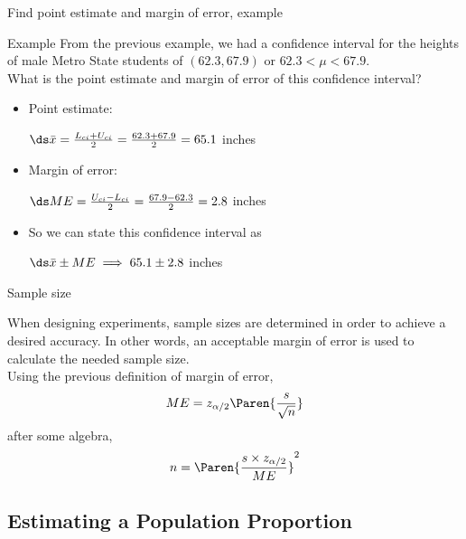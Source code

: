 \documentclass[xcolor=table, handout]{beamer}
\begin{document}
\begin{frame}{Find point estimate and margin of error, example}
\begin{exampleblock}{Example}
From the previous example, we had a confidence interval for the heights of male Metro State students of $(62.3, 67.9)$ or $62.3 < \mu < 67.9$.\\
\medskip
 What is the point estimate and margin of error of this confidence interval?\\
\medskip
\begin{itemize}
\pause\item Point estimate:\\
\smallskip
{\centering
$\ds \bar x = \frac {L_{ci} + U_{ci}}{2} = \frac {62.3 + 67.9}{2} = 65.1$ inches
\par}
\smallskip
\pause\item Margin of error:\\
\smallskip
{\centering
$\ds ME = \frac {U_{ci} - L_{ci}}{2} = \frac {67.9 - 62.3}{2} = 2.8$ inches
\par}
\smallskip
\pause\item So we can state this confidence interval as\\
\smallskip
{\centering
$\ds \bar x \pm ME \implies 65.1 \pm 2.8$ inches
\par}

\end{itemize}
\medskip
\end{exampleblock}

\end{frame}

\begin{frame}{Sample size}
\begin{block}{}
\large
When designing experiments, sample sizes are determined in order to achieve a desired accuracy. In other words, an acceptable margin of error is used to calculate the needed sample size.\\
\pause\medskip
Using the previous definition of margin of error,
\[ME = z_{\alpha/2} \Paren{\frac s {\sqrt n}}\]
after some algebra,
\[ n = \Paren{\frac {s \times z_{\alpha/2}}{ME}}^2\]
\end{block}
\end{frame}

\subsection{Estimating a Population Proportion}
\end{document}
